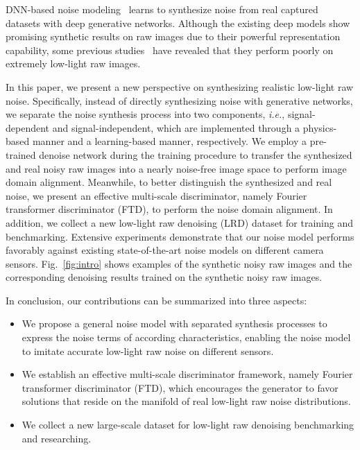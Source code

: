 \documentclass[10pt,twocolumn,letterpaper]{article}
\def\ie{{\it{i.e.}}}
\begin{document}
DNN-based noise modeling~\cite{abdelhamed2019noise, chang2020learning} learns to synthesize noise from real captured datasets with deep generative networks. Although the existing deep models show promising synthetic results on raw images due to their powerful representation capability, some previous studies~\cite{zhang2021rethinking,monakhova2022dancing} have revealed that they perform poorly on extremely low-light raw images.

In this paper, we present a new perspective on synthesizing realistic low-light raw noise. Specifically, instead of directly synthesizing noise with generative networks, we separate the noise synthesis process into two components, \ie, signal-dependent and signal-independent, which are implemented through a physics-based manner and a learning-based manner, respectively. We employ a pre-trained denoise network during the training procedure to transfer the synthesized and real noisy raw images into a nearly noise-free image space to perform image domain alignment. Meanwhile, to better distinguish the synthesized and real noise, we present an effective multi-scale discriminator, namely Fourier transformer discriminator (FTD), to perform the noise domain alignment. In addition, we collect a new low-light raw denoising (LRD) dataset for training and benchmarking. Extensive experiments demonstrate that our noise model performs favorably against existing state-of-the-art noise models on different camera sensors. Fig.~\ref{fig:intro} shows examples of the synthetic noisy raw images and the corresponding denoising results trained on the synthetic noisy raw images. 

In conclusion, our contributions can be summarized into three aspects:
\vspace{-0.5em}
\begin{itemize}
\vspace{-0.5em}
\item We propose a general noise model with separated synthesis processes to express the noise terms of according characteristics, enabling the noise model to imitate accurate low-light raw noise on different sensors.
\vspace{-0.5em}
\item We establish an effective multi-scale discriminator framework, namely Fourier transformer discriminator (FTD), which encourages the generator to favor solutions that reside on the manifold of real low-light raw noise distributions.
\vspace{-0.5em}
\item We collect a new large-scale dataset for low-light raw denoising benchmarking and researching.
\end{itemize}
\end{document}
